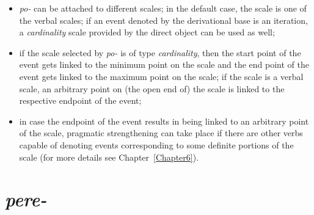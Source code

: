 \begin{itemize}
\item \textit{po-} can be attached to different scales; in the default case, the scale is one of the verbal scales; if an event denoted by the derivational base is an iteration, a \textit{cardinality} scale provided by the direct object can be used as well;
\item if the scale selected by \textit{po-} is of type \textit{cardinality}, then the start point of the event gets linked to the minimum point on the scale and the end point of the event gets linked to the maximum point on the scale; if the scale is a verbal scale, an arbitrary point on (the open end of) the scale is linked to the respective endpoint of the event;
\item in case the endpoint of the event results in being linked to an arbitrary point of the scale, pragmatic strengthening can take place if there are other verbs capable of denoting events corresponding to some definite portions of the scale (for more details see Chapter~\ref{Chapter6}).
\end{itemize}



\section{\textit{pere-}}\label{subsection:semantics:pere}
